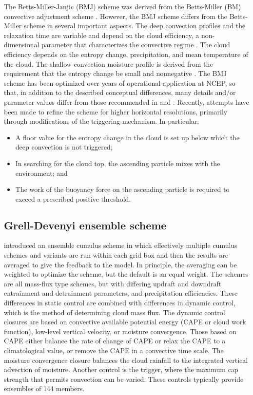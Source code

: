 The Betts-Miller-Janjic (BMJ) scheme  \citep{janjic94,janjic00} 
was derived from the Betts-Miller (BM) convective adjustment scheme 
\citep{betts86,bettsmiller86}.  However, the BMJ scheme differs 
from the Betts-Miller scheme in several important aspects. The deep convection 
profiles and the relaxation time are variable and depend on the cloud 
efficiency, a non-dimensional parameter that characterizes the convective 
regime \citep{janjic94}. The cloud efficiency depends on the entropy change, 
precipitation, and mean temperature of the cloud. The shallow convection 
moisture profile is derived from the requirement that the entropy change be 
small and nonnegative \citep{janjic94}.  The BMJ scheme has been optimized 
over years of operational application at NCEP,
so that, in addition to the described conceptual 
differences, many details and/or parameter values differ from those 
recommended in \citet{betts86} and \citet{bettsmiller86}.  Recently, attempts 
have been made to refine the scheme for higher horizontal resolutions, 
primarily through modifications of the triggering mechanism.  In particular:
 
\begin{itemize}\setlength{\parskip}{-4pt}
\item
A floor value for the entropy change in the cloud is set up below which the 
deep convection is not triggered;
\item
In searching for the cloud top, the ascending particle mixes with the environment; and
\item
The work of the buoyancy force on the ascending particle is required to exceed 
a prescribed positive threshold.
\end{itemize}

\subsection{Grell-Devenyi ensemble scheme}

\citet{grell02} introduced an ensemble cumulus scheme 
in which effectively multiple cumulus schemes and variants are run 
within each grid box and then the results are averaged to give the 
feedback to the model. In principle, the averaging can be weighted 
to optimize the scheme, but the default is an equal weight. 
The schemes are all mass-flux type schemes, but with differing updraft 
and downdraft entrainment and detrainment parameters, and precipitation 
efficiencies. These differences in static control are combined with 
differences in dynamic control, which is the method of determining 
cloud mass flux. The dynamic control closures are based on convective 
available potential energy (CAPE or cloud work function), low-level 
vertical velocity, or moisture convergence. Those based on CAPE 
either balance the rate of change of CAPE or relax the CAPE to a 
climatological value, or remove the CAPE in a convective time scale. 
The moisture convergence closure balances the cloud rainfall to the 
integrated vertical advection of moisture. Another control
is the trigger, where the maximum cap strength that permits convection
can be varied. These controls typically provide ensembles of 144 members.

